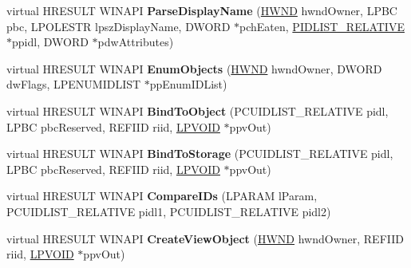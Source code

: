 \begin{DoxyCompactItemize}
\item 
\mbox{\label{class_c_f_s_folder_aaa0184b7a62724cec4bbaaa20a8da052}} 
virtual H\+R\+E\+S\+U\+LT W\+I\+N\+A\+PI {\bfseries Parse\+Display\+Name} (\hyperlink{interfacevoid}{H\+W\+ND} hwnd\+Owner, L\+P\+BC pbc, L\+P\+O\+L\+E\+S\+TR lpsz\+Display\+Name, D\+W\+O\+RD $\ast$pch\+Eaten, \hyperlink{struct___i_t_e_m_i_d_l_i_s_t___r_e_l_a_t_i_v_e}{P\+I\+D\+L\+I\+S\+T\+\_\+\+R\+E\+L\+A\+T\+I\+VE} $\ast$ppidl, D\+W\+O\+RD $\ast$pdw\+Attributes)
\item 
\mbox{\label{class_c_f_s_folder_aa93973bce98ca6b19701f501f0fbb9ba}} 
virtual H\+R\+E\+S\+U\+LT W\+I\+N\+A\+PI {\bfseries Enum\+Objects} (\hyperlink{interfacevoid}{H\+W\+ND} hwnd\+Owner, D\+W\+O\+RD dw\+Flags, L\+P\+E\+N\+U\+M\+I\+D\+L\+I\+ST $\ast$pp\+Enum\+I\+D\+List)
\item 
\mbox{\label{class_c_f_s_folder_a9b5f42d49f605ce14e029a1378c1d683}} 
virtual H\+R\+E\+S\+U\+LT W\+I\+N\+A\+PI {\bfseries Bind\+To\+Object} (P\+C\+U\+I\+D\+L\+I\+S\+T\+\_\+\+R\+E\+L\+A\+T\+I\+VE pidl, L\+P\+BC pbc\+Reserved, R\+E\+F\+I\+ID riid, \hyperlink{interfacevoid}{L\+P\+V\+O\+ID} $\ast$ppv\+Out)
\item 
\mbox{\label{class_c_f_s_folder_a91941a320e52b783bf8e88d97c089141}} 
virtual H\+R\+E\+S\+U\+LT W\+I\+N\+A\+PI {\bfseries Bind\+To\+Storage} (P\+C\+U\+I\+D\+L\+I\+S\+T\+\_\+\+R\+E\+L\+A\+T\+I\+VE pidl, L\+P\+BC pbc\+Reserved, R\+E\+F\+I\+ID riid, \hyperlink{interfacevoid}{L\+P\+V\+O\+ID} $\ast$ppv\+Out)
\item 
\mbox{\label{class_c_f_s_folder_ae4efd9c2c5f5cfd4fcf45f3209d83954}} 
virtual H\+R\+E\+S\+U\+LT W\+I\+N\+A\+PI {\bfseries Compare\+I\+Ds} (L\+P\+A\+R\+AM l\+Param, P\+C\+U\+I\+D\+L\+I\+S\+T\+\_\+\+R\+E\+L\+A\+T\+I\+VE pidl1, P\+C\+U\+I\+D\+L\+I\+S\+T\+\_\+\+R\+E\+L\+A\+T\+I\+VE pidl2)
\item 
\mbox{\label{class_c_f_s_folder_a2496a73dcba42988d7e407d4c1a256cf}} 
virtual H\+R\+E\+S\+U\+LT W\+I\+N\+A\+PI {\bfseries Create\+View\+Object} (\hyperlink{interfacevoid}{H\+W\+ND} hwnd\+Owner, R\+E\+F\+I\+ID riid, \hyperlink{interfacevoid}{L\+P\+V\+O\+ID} $\ast$ppv\+Out)

\end{DoxyCompactItemize}
